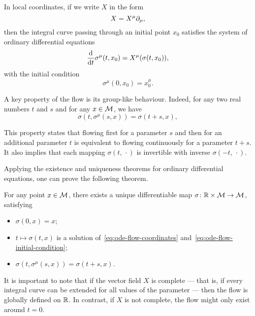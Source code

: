 In local coordinates, if we write $X$ in the form
\begin{equation}
    X = X^\mu \partial_\mu,
\end{equation}
then the integral curve passing through an initial point $x_0$ satisfies the system of ordinary differential equations
\begin{equation}\label{eq:ode-flow-coordinates}
	\frac{\mathop{}\!\mathrm{d}}{\mathop{}\!\mathrm{d} t} \sigma^\mu (t,x_0) = X^\mu (\sigma(t,x_0)),
\end{equation}
with the initial condition
\begin{equation}\label{eq:ode-flow-initial-condition}
	\sigma^\mu(0,x_0) = x^\mu_0.
\end{equation}

A key property of the flow is its group-like behaviour. Indeed, for any two real numbers $t$ and $s$ and for any $x\in\mathcal{M}$, we have
\begin{equation}\label{eq:property-flow}
	\sigma(t, \sigma^\mu(s,x)) = \sigma(t+s,x),
\end{equation}

This property states that flowing first for a parameter $s$ and then for an additional parameter $t$ is equivalent to flowing continuously for a parameter $t + s$. It also implies that each mapping $\sigma(t,\,\cdot)$ is invertible with inverse $\sigma(-t,\,\cdot)$.

Applying the existence and uniqueness theorems for ordinary differential equations, one can prove the following theorem.

\begin{theorem}
	For any point $x \in \mathcal{M}$, there exists a unique differentiable map $\sigma \colon \mathbb{R} \times \mathcal{M} \to \mathcal{M}$, satisfying
	\begin{itemize}
		\item $\sigma(0,x) = x$;
		\item $t \mapsto \sigma(t,x)$ is a solution of~\eqref{eq:ode-flow-coordinates} and~\eqref{eq:ode-flow-initial-condition};
		\item $\sigma(t,\sigma^\mu(s,x)) = \sigma(t+s,x)$.
	\end{itemize}
\end{theorem}

It is important to note that if the vector field $X$ is complete — that is, if every integral curve can be extended for all values of the parameter — then the flow is globally defined on $\mathbb{R}$. In contrast, if $X$ is not complete, the flow might only exist around $t = 0$.

